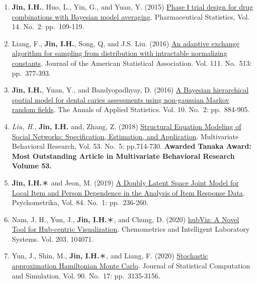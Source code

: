 \documentclass[]{book}
\begin{document}
\begin{enumerate}
\item
  \textbf{Jin, I.H.}, Huo, L., Yin, G., and Yuan, Y. (2015) \href{https://pubmed.ncbi.nlm.nih.gov/25641851/}{Phase Ⅰ trial design for drug combinations with Bayesian model averaging}. Pharmaceutical Statistics, Vol. 14. No.~2: pp.~109-119.
\item
  Liang, F., \textbf{Jin, I.H.}, Song, Q, and J.S. Liu. (2016) \href{https://www.researchgate.net/publication/272376704_An_Adaptive_Exchange_Algorithm_for_Sampling_From_Distributions_With_Intractable_Normalizing_Constants}{An adaptive exchange algorithm for sampling from distribution with intractable normalizing constants}. Journal of the American Statistical Association. Vol. 111. No.~513: pp.~377-393.
\item
  \textbf{Jin, I.H.}, Yuan, Y., and Bandyopadhyay, D. (2016) \href{https://www.researchgate.net/publication/305627921_A_Bayesian_hierarchical_spatial_model_for_dental_caries_assessment_using_non-Gaussian_Markov_random_fields}{A Bayesian hierarchical spatial model for dental caries assessments using non-gaussian Markov random fields}. The Annals of Applied Statistics. Vol. 10. No.~2: pp.~884-905.
\item
  \emph{Liu, H.}, \textbf{Jin, I.H.} and, Zhang, Z. (2018) \href{https://www.researchgate.net/publication/329215082_Structural_Equation_Modeling_of_Social_Networks_Specification_Estimation_and_Application}{Structural Equation Modeling of Social Networks: Specification, Estimation, and Application}. Multivariate Behavioral Research, Vol. 53. No.~5: pp.714-730. \textbf{Awarded Tanaka Award: Most Outstanding Article in Multivariate Behavioral Research Volume 53.}
\item
  \textbf{Jin, I.H.}＊ and Jeon, M. (2019) \href{https://www.researchgate.net/publication/326276196_A_Doubly_Latent_Space_Joint_Model_for_Local_Item_and_Person_Dependence_in_the_Analysis_of_Item_Response_Data}{A Doubly Latent Space Joint Model for Local Item and Person Dependence in the Analysis of Item Response Data}. Psychometrika, Vol. 84. No.~1: pp.~236-260.
\item
  Nam, J. H., Yun, J., \textbf{Jin, I.H.}＊, and Chung, D. (2020) \href{https://www.researchgate.net/publication/341850019_hubViz_A_Novel_Tool_for_Hub-centric_Visualization}{hubViz: A Novel Tool for Hub-centric Visualization}. Chemometrics and Intelligent Laboratory Systems. Vol. 203. 104071.
\item
  Yun, J., Shin, M., \textbf{Jin, I.H.}＊, and Liang, F. (2020) \href{https://arxiv.org/abs/1810.04811}{Stochastic approximation Hamiltonian Monte Carlo}. Journal of Statistical Computation and Simulation. Vol. 90. No.~17: pp.~3135-3156.

\end{enumerate}
\end{document}
